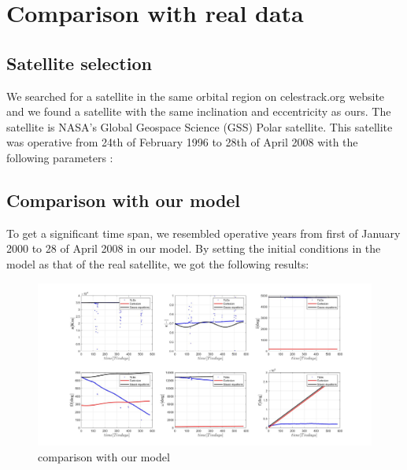 \documentclass[11pt,a4paper]{report}
\begin{document}
\section{Comparison with real data}

\subsection{Satellite selection}
We searched for a satellite in the same orbital region on celestrack.org website and we found a satellite with the same inclination and eccentricity as ours. 
The satellite is NASA’s Global Geospace Science (GSS) Polar satellite.
This satellite was operative from 24th of February 1996 to 28th of April 2008 with the following parameters :

\begin{table}[H]
\centering
{}
\end{table}
\subsection{Comparison with our model}

To get a significant time span, we resembled operative years from first of January 2000 to 28 of April 2008 in our model.
By setting the initial conditions in the model as that of the real satellite, we got the following results: 

\begin{figure}[H]
\centering
\includegraphics[width=1\textwidth]{comparisonwithtles}
\caption{comparison with our model}
\end{figure}
\end{document}
